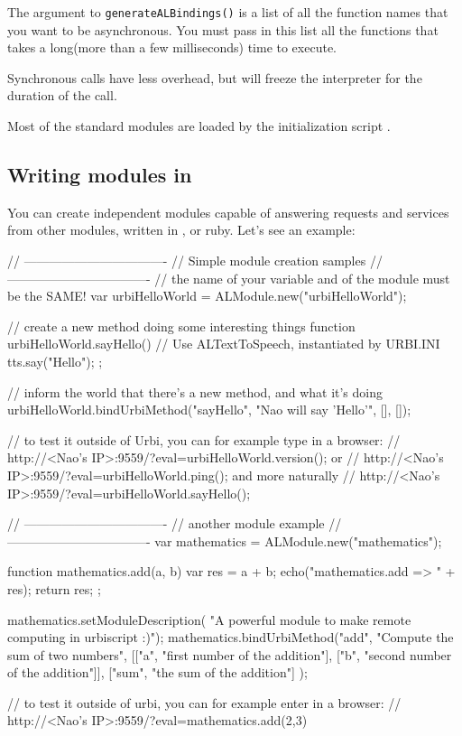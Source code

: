 The argument to \lstinline|generateALBindings()| is a list of all the
function names that you want to be asynchronous. You must pass in this
list all the functions that takes a long(more than a few milliseconds)
time to execute.

Synchronous calls have less overhead, but will freeze the \us
interpreter for the duration of the call.

Most of the standard modules are loaded by the initialization script
.

\subsection{Writing \naoqi modules in \urbi}

You can create independent modules capable of answering requests and
services from other \naoqi modules, written in \Cxx, \us or
ruby. Let's see an example:

\begin{urbiunchecked}
// ----------------------------------
// Simple module creation samples
// ----------------------------------
// the name of your variable and of the module must be the SAME!
var urbiHelloWorld = ALModule.new("urbiHelloWorld");

// create a new method doing some interesting things
function urbiHelloWorld.sayHello()
{
  // Use ALTextToSpeech, instantiated by URBI.INI
  tts.say("Hello");
};

// inform the world that there's a new method, and what it's doing
urbiHelloWorld.bindUrbiMethod("sayHello", "Nao will say 'Hello'", [], []);

// to test it outside of Urbi, you can for example type in a browser:
// http://<Nao's IP>:9559/?eval=urbiHelloWorld.version(); or
// http://<Nao's IP>:9559/?eval=urbiHelloWorld.ping(); and more naturally
// http://<Nao's IP>:9559/?eval=urbiHelloWorld.sayHello();

// ----------------------------------
// another module example
// ----------------------------------
var mathematics = ALModule.new("mathematics");

function mathematics.add(a, b)
{
  var res = a + b;
  echo("mathematics.add => " + res);
  return res;
};

mathematics.setModuleDescription(
  "A powerful module to make remote computing in urbiscript :)");
mathematics.bindUrbiMethod("add", "Compute the sum of two numbers",
[["a",   "first number of the addition"],
 ["b",   "second number of the addition"]],
 ["sum", "the sum of the addition"] );

// to test it outside of urbi, you can for example enter in a browser:
// http://<Nao's IP>:9559/?eval=mathematics.add(2,3)
\end{urbiunchecked}


